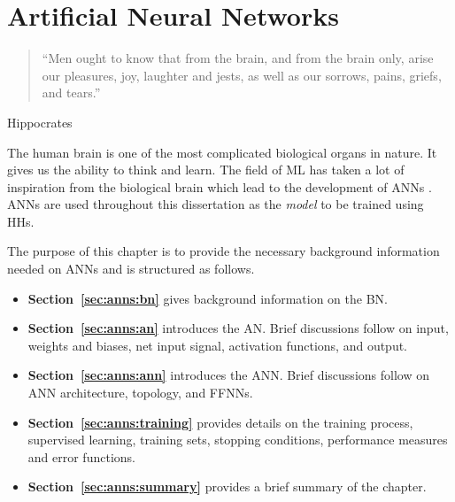 \chapter{Artificial Neural Networks}
\label{chap:anns}

\begin{quotation}
    \noindent ``Men ought to know that from the brain, and from the brain only, arise our pleasures, joy, laughter and jests, as well as our sorrows, pains, griefs, and tears.''
\end{quotation}
\begin{flushright}
    Hippocrates
\end{flushright}

\noindent
The human brain is one of the most complicated biological organs in nature. It gives us the ability to think and learn. The field of \acs{ML} has taken a lot of inspiration from the biological brain which lead to the development of \acp{ANN} \cite{ref:rosenblatt:1958}. \acp{ANN} are used throughout this dissertation as the \textit{model} to be trained using \acp{HH}.

The purpose of this chapter is to provide the necessary background information needed on \acp{ANN} and is structured as follows.

\begin{itemize}
    \item \textbf{Section~\ref{sec:anns:bn}} gives background information on the \acs{BN}.

    \item \textbf{Section~\ref{sec:anns:an}} introduces the \acs{AN}. Brief discussions follow on input, weights and biases, net input signal, activation functions, and output.

    \item \textbf{Section~\ref{sec:anns:ann}} introduces the \acs{ANN}. Brief discussions follow on \acs{ANN} architecture, topology, and \acp{FFNN}.

    \item \textbf{Section~\ref{sec:anns:training}} provides details on the training process, supervised learning, training sets, stopping conditions, performance measures and error functions.

    \item \textbf{Section~\ref{sec:anns:summary}} provides a brief summary of the chapter.
\end{itemize}


